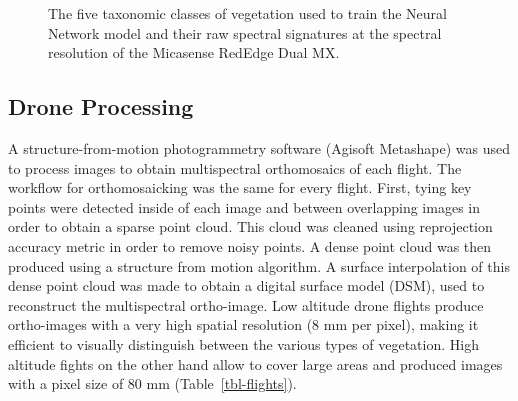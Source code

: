 \documentclass[
  number]{elsarticle}
\begin{document}
\label{cell-fig-vegetation}
\begin{figure}[H]


\caption{\label{fig-vegetation}The five taxonomic classes of vegetation
used to train the Neural Network model and their raw spectral signatures
at the spectral resolution of the Micasense RedEdge Dual MX.}

\end{figure}%

\subsection{Drone Processing}\label{drone-processing}

A structure-from-motion photogrammetry software (Agisoft Metashape) was
used to process images to obtain multispectral orthomosaics of each
flight. The workflow for orthomosaicking was the same for every flight.
First, tying key points were detected inside of each image and between
overlapping images in order to obtain a sparse point cloud. This cloud
was cleaned using reprojection accuracy metric in order to remove noisy
points. A dense point cloud was then produced using a structure from
motion algorithm. A surface interpolation of this dense point cloud was
made to obtain a digital surface model (DSM), used to reconstruct the
multispectral ortho-image. Low altitude drone flights produce
ortho-images with a very high spatial resolution (8 mm per pixel),
making it efficient to visually distinguish between the various types of
vegetation. High altitude fights on the other hand allow to cover large
areas and produced images with a pixel size of 80 mm
(Table~\ref{tbl-flights}).
\end{document}
